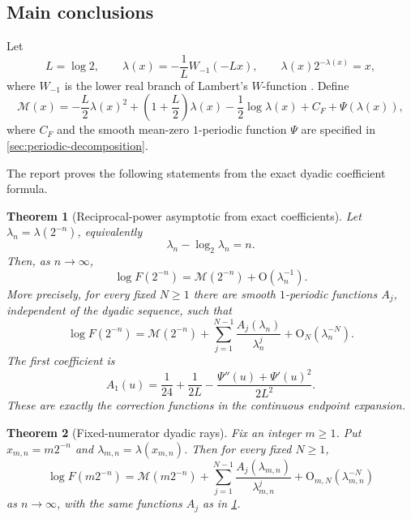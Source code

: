 \documentclass[11pt,oneside]{article}
\newtheorem{theorem}{Theorem}[section]
\theoremstyle{definition}
\theoremstyle{remark}
\newcommand{\bigO}{\mathrm O}
\newcommand{\Mmain}{\mathcal M}
\begin{document}
\subsection{Main conclusions}

Let
\begin{equation}
 L=\log2,
 \qquad
 \lambda(x)=-\frac1L W_{-1}(-Lx),
 \qquad
 \lambda(x)2^{-\lambda(x)}=x,
\label{eq:lambda-def}
\end{equation}
where $W_{-1}$ is the lower real branch of Lambert's $W$-function \cite{corless1996}.  Define
\begin{equation}
 \Mmain(x)=
 -\frac L2\lambda(x)^2+
 \left(1+\frac L2\right)\lambda(x)
 -\frac12\log\lambda(x)+C_F+\Psi(\lambda(x)),
\label{eq:main-M}
\end{equation}
where $C_F$ and the smooth mean-zero $1$-periodic function $\Psi$ are specified in
\cref{sec:periodic-decomposition}.

The report proves the following statements from the exact dyadic coefficient formula.

\begin{theorem}[Reciprocal-power asymptotic from exact coefficients]
\label{thm:main-inverse}
Let $\lambda_n=\lambda(2^{-n})$, equivalently
\begin{equation}
 \lambda_n-\log_2\lambda_n=n.
\label{eq:lambda-n-equation}
\end{equation}
Then, as $n\to\infty$,
\begin{equation}
 \log F(2^{-n})=\Mmain(2^{-n})+\bigO(\lambda_n^{-1}).
\label{eq:main-inverse-leading}
\end{equation}
More precisely, for every fixed $N\ge1$ there are smooth $1$-periodic functions
$A_j$, independent of the dyadic sequence, such that
\begin{equation}
 \log F(2^{-n})=
 \Mmain(2^{-n})+
 \sum_{j=1}^{N-1}\frac{A_j(\lambda_n)}{\lambda_n^j}
 +\bigO_N(\lambda_n^{-N}).
\label{eq:main-inverse-all}
\end{equation}
The first coefficient is
\begin{equation}
 A_1(u)=\frac1{24}+\frac1{2L}
 -\frac{\Psi''(u)+\Psi'(u)^2}{2L^2}.
\label{eq:A1}
\end{equation}
These are exactly the correction functions in the continuous endpoint expansion.
\end{theorem}

\begin{theorem}[Fixed-numerator dyadic rays]
\label{thm:main-fixed-m}
Fix an integer $m\ge1$.  Put $x_{m,n}=m2^{-n}$ and
$\lambda_{m,n}=\lambda(x_{m,n})$.  Then for every fixed $N\ge1$,
\begin{equation}
 \log F(m2^{-n})=
 \Mmain(m2^{-n})+
 \sum_{j=1}^{N-1}\frac{A_j(\lambda_{m,n})}{\lambda_{m,n}^j}
 +\bigO_{m,N}(\lambda_{m,n}^{-N})
\label{eq:main-fixed-m}
\end{equation}
as $n\to\infty$, with the same functions $A_j$ as in
\cref{thm:main-inverse}.
\end{theorem}
\end{document}
